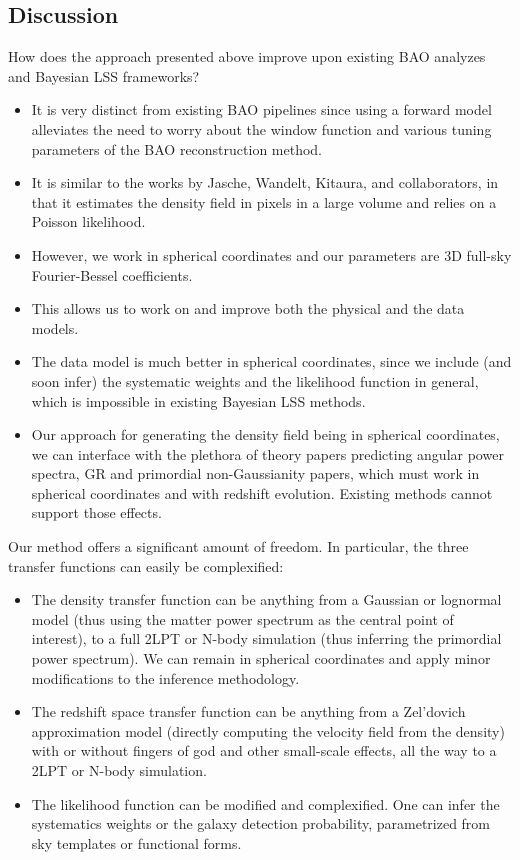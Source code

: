 \documentclass{aastex6}
\begin{document}
\subsection{Discussion}

How does the approach presented above improve upon existing BAO analyzes and Bayesian LSS frameworks?
\begin{itemize}
	\item It is very distinct from existing BAO pipelines since using a forward model alleviates the need to worry about the window function and various tuning parameters of the BAO reconstruction method.
	\item	It is similar to the works by Jasche, Wandelt, Kitaura, and collaborators, in that it estimates the density field in pixels in a large volume and relies on a Poisson likelihood. 
	\item However, we work in spherical coordinates and our parameters are 3D full-sky Fourier-Bessel coefficients. 
	\item This allows us to work on and improve both the physical and the data models.
	\item The data model is much better in spherical coordinates, since we include (and soon infer) the systematic weights and the likelihood function in general, which is impossible in existing Bayesian LSS methods.
	\item Our approach for generating the density field being in spherical coordinates, we can interface with the plethora of theory papers predicting angular power spectra, GR and primordial non-Gaussianity papers, which must work in spherical coordinates and with redshift evolution. 
	Existing methods cannot support those effects.
\end{itemize}

Our method offers a significant amount of freedom. In particular, the three transfer functions can easily be complexified:
\begin{itemize}
	\item The density transfer function can be anything from a Gaussian or lognormal model (thus using the matter power spectrum as the central point of interest), to a full 2LPT or N-body simulation (thus inferring the primordial power spectrum). We can remain in spherical coordinates and apply minor modifications to the inference methodology.
	\item The redshift space transfer function can be anything from a Zel'dovich approximation model (directly computing the velocity field from the density) with or without fingers of god and other small-scale effects, all the way to a 2LPT or N-body simulation.
	\item The likelihood function can be modified and complexified. One can infer the systematics weights or the galaxy detection probability, parametrized from sky templates or functional forms.
\end{itemize}
\end{document}
